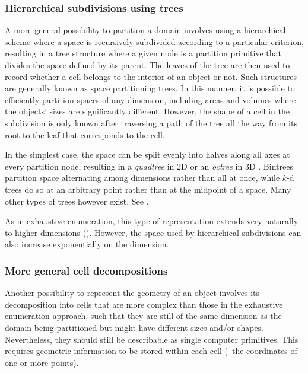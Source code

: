 \subsubsection{Hierarchical subdivisions using trees}

A more general possibility to partition a domain involves using a hierarchical scheme where a space is recursively subdivided according to a particular criterion, resulting in a tree structure where a given node is a partition primitive that divides the space defined by its parent.
The leaves of the tree are then used to record whether a cell belongs to the interior of an object or not.
Such structures are generally known as space partitioning trees.
In this manner, it is possible to efficiently partition spaces of any dimension, including areas and volumes where the objects' sizes are significantly different.
However, the shape of a cell in the subdivision is only known after traversing a path of the tree all the way from its root to the leaf that corresponds to the cell.

In the simplest case, the space can be split evenly into halves along all axes at every partition node, resulting in a \emph{quadtree} in 2D \citep{Finkel74} or an \emph{octree} in 3D \citep{Meagher80}.
Bintrees \citep{Samet85} partition space alternating among dimensions rather than all at once, while $k$-d trees \citep{Bentley75} do so at an arbitrary point rather than at the midpoint of a space.
Many other types of trees however exist.
See \citep{Manolopoulos06}.

As in exhaustive enumeration, this type of representation extends very naturally to higher dimensions ().
However, the space used by hierarchical subdivisions can also increase exponentially on the dimension.

\subsubsection{More general cell decompositions}

Another possibility to represent the geometry of an object involves its decomposition into cells that are more complex than those in the exhaustive enumeration approach, such that they are still of the same dimension as the domain being partitioned but might have different sizes and/or shapes.
Nevertheless, they should still be describable as single computer primitives.
This requires geometric information to be stored within each cell (\eg\ the coordinates of one or more points).

